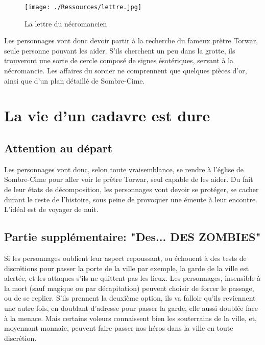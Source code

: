 \documentclass[a4paper, 11pt]{article}
\begin{document}
\begin{figure}[p]
\begin{center}
\hypertarget{lettre}{}
\texttt{[image: ./Ressources/lettre.jpg]}
\caption{La lettre du nécromancien}
\end{center}
\end{figure}

Les personnages vont donc devoir partir à la recherche du fameux prêtre Torwar, seule personne pouvant les aider.
\newline
S'ils cherchent un peu dans la grotte, ils trouveront une sorte de cercle composé de signes ésotériques, servant à la nécromancie. Les affaires du sorcier ne comprennent que quelques pièces d'or, ainsi que d'un plan détaillé de Sombre-Cime.

\section{La vie d'un cadavre est dure}
\subsection{Attention au départ}
Les personnages vont donc, selon toute vraisemblance, se rendre à l'église de Sombre-Cime pour aller voir le prêtre Torwar, seul capable de les aider.
Du fait de leur états de décomposition, les personnages vont devoir se protéger, se cacher durant le reste de l'histoire, sous peine de provoquer une émeute à leur encontre. L'idéal est de voyager de nuit.
\subsection{Partie supplémentaire: "Des... DES ZOMBIES"} 
Si les personnages oublient leur aspect repoussant, ou échouent à des tests de discrétions pour passer la porte de la ville par exemple, la garde de la ville est alertée, et les attaques s'ils ne quittent pas les lieux. Les personnages, insensible à la mort (sauf magique ou par décapitation) peuvent choisir de forcer le passage, ou de se replier. S'ils prennent la deuxième option, ils va falloir qu'ils reviennent une autre fois, en doublant d'adresse pour passer la garde, elle aussi doublée face à la menace.
\newline
Mais certains voleurs connaissent bien les souterrains de la ville, et, moyennant monnaie, peuvent faire passer nos héros dans la ville en toute discrétion.
\end{document}

